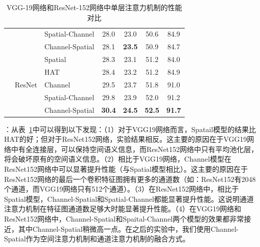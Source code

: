 \begin{table}[t]
{\begin{tabular}{|l| l |l| c c c c|}
& & Spatial-Channel &28.0 &23.0 & 50.6& 84.9\\
& & Channel-Spatial & 28.1 & \textbf{23.5} & 50.9& 84.7\\
\cline{2-7}
& \multirow{5}{*}{ResNet} & Spatial & 28.3 & 23.1 & 51.2 & 84.0 \\
&  & HAT & 28.4 & 23.2 & 51.2 & 84.9 \\
&  & Channel & 29.5 & 23.7 & 51.8 & 91.0 \\
& & Spatial-Channel &29.8 &23.9 & 52.0& 91.2\\
& & Channel-Spatial & \textbf{30.4} & \textbf{24.5} & \textbf{52.5} & \textbf{91.7}\\
\hline
\end{tabular}}
\caption{VGG-19网络和ResNet-152网络中单层注意力机制的性能对比} 
\label{ch5:tab:Q1}
\end{table}

\textbf{}：从表~\ref{ch5:tab:Q1}中可以得到以下发现：（1）对于VGG19网络而言，Spatail模型的结果比HAT的好；但对于ResNet152网络，实验结果相反。这主要的原因在于VGG19网络中有全连接层，可以保持空间语义信息，而ResNet152网络中只有平均池化层，将会破坏原有的空间语义信息。（2）相比于VGG19网络，Channel模型在ResNet152网络中可以显著提升性能（与Spatial模型相比）。这主要的原因在于ResNet152网络的最后一个卷积特征图拥有更多的通道数（如：ResNet152有2048个通道，而VGG19网络只有512个通道）。（3）在ResNet152网络中，相比于Spatial模型，Channel-Spatial和Spatial-Channel都能显著提升性能。这说明通道注意力机制在特征图通道数足够大时能显著提升性能。（4）在VGG19网络和ResNet152网络中，Channel-Spatial和Spaital-Channel两个模型的效果都非常接近，其中Channel-Spatial稍微高一点。在之后的实验中，我们使用Channel-Spatial作为空间注意力机制和通道注意力机制的融合方式。


